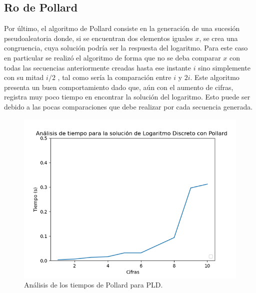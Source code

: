 \documentclass{article}
\begin{document}
    \subsection{Ro de Pollard}
    Por último, el algoritmo de Pollard consiste en la generación de una sucesión pseudoaleatoria donde, si se encuentran dos elementos iguales \begin{math}x\end{math}, se crea una congruencia, cuya solución podría ser la respuesta del logaritmo. Para este caso en particular se realizó el algoritmo de forma que no se deba comparar \begin{math}x\end{math} con todas las secuencias anteriormente creadas hasta ese instante \begin{math}i\end{math} sino simplemente con su mitad \begin{math}i/2\end{math} , tal como sería la comparación entre \begin{math}i\end{math} y \begin{math}2i\end{math}.
    Este algoritmo presenta un buen comportamiento dado que, aún con el aumento de cifras, registra muy poco tiempo en encontrar la solución del logaritmo. Esto puede ser debido a las pocas comparaciones que debe realizar por cada secuencia generada.
     \begin{figure}[ht!]
        \centering
        \includegraphics[width=\linewidth]{Figure_9}
        \caption{Análisis de los tiempos de Pollard para PLD.}
        \label{fig:Figure_6}
    \end{figure}
    \newpage
    
\end{document}
